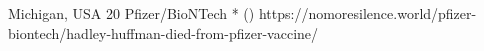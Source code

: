           {Michigan, USA}
          {20}
          {Pfizer/BioNTech}
          {*}
          {
             ()
          }
          {https://nomoresilence.world/pfizer-biontech/hadley-huffman-died-from-pfizer-vaccine/}


